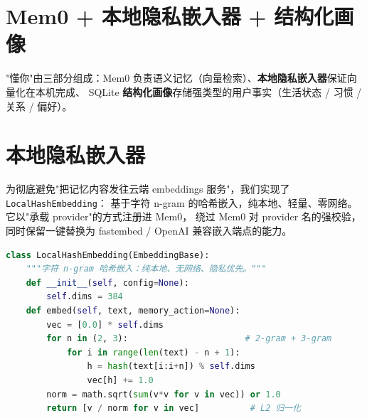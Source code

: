 \section{Mem0 + 本地隐私嵌入器 + 结构化画像}
"懂你"由三部分组成：Mem0 负责语义记忆（向量检索）、\textbf{本地隐私嵌入器}保证向量化在本机完成、
SQLite \textbf{结构化画像}存储强类型的用户事实（生活状态 / 习惯 / 关系 / 偏好）。

\begin{center}
\end{center}

\section{本地隐私嵌入器}
为彻底避免"把记忆内容发往云端 embeddings 服务"，我们实现了 \texttt{LocalHashEmbedding}：
基于字符 n-gram 的哈希嵌入，纯本地、轻量、零网络。它以"承载 provider"的方式注册进 Mem0，
绕过 Mem0 对 provider 名的强校验，同时保留一键替换为 fastembed / OpenAI 兼容嵌入端点的能力。

\begin{lstlisting}[language=Python,caption={本地隐私嵌入器（memory/embedder.py 摘选）}]
class LocalHashEmbedding(EmbeddingBase):
    """字符 n-gram 哈希嵌入：纯本地、无网络、隐私优先。"""
    def __init__(self, config=None):
        self.dims = 384
    def embed(self, text, memory_action=None):
        vec = [0.0] * self.dims
        for n in (2, 3):                       # 2-gram + 3-gram
            for i in range(len(text) - n + 1):
                h = hash(text[i:i+n]) % self.dims
                vec[h] += 1.0
        norm = math.sqrt(sum(v*v for v in vec)) or 1.0
        return [v / norm for v in vec]          # L2 归一化
\end{lstlisting}

